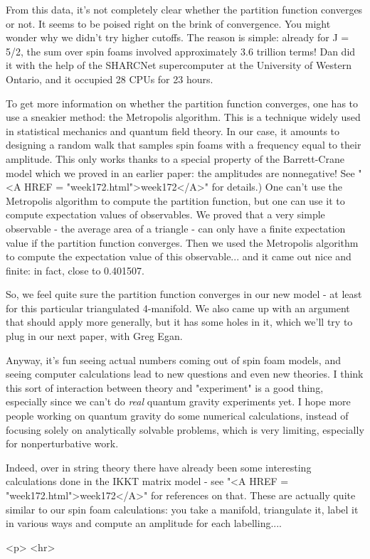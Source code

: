 From this data, it's not completely clear whether the partition function
converges or not.  It seems to be poised right on the brink of convergence.  
You might wonder why we didn't try higher cutoffs.  The reason is simple: 
already for J = 5/2, the sum over spin foams involved approximately 3.6 
trillion terms!  Dan did it with the help of the SHARCNet supercomputer 
at the University of Western Ontario, and it occupied 28 CPUs for 23 hours.

To get more information on whether the partition function converges, one
has to use a sneakier method: the Metropolis algorithm.  This is a
technique widely used in statistical mechanics and quantum field theory.
In our case, it amounts to designing a random walk that samples spin
foams with a frequency equal to their amplitude.  This only works thanks
to a special property of the Barrett-Crane model which we proved in an
earlier paper: the amplitudes are nonnegative!  See "<A HREF =
"week172.html">week172</A>" for details.)  One can't use the
Metropolis algorithm to compute the partition function, but one can use
it to compute expectation values of observables.  We proved that a very
simple observable - the average area of a triangle - can only have a
finite expectation value if the partition function converges.  Then we
used the Metropolis algorithm to compute the expectation value of this
observable... and it came out nice and finite: in fact, close to
0.401507.

So, we feel quite sure the partition function converges in our new model - 
at least for this particular triangulated 4-manifold.  We also came up
with an argument that should apply more generally, but it has some 
holes in it, which we'll try to plug in our next paper, with Greg Egan.

Anyway, it's fun seeing actual numbers coming out of spin foam models,
and seeing computer calculations lead to new questions and even new
theories.  I think this sort of interaction between theory and
"experiment" is a good thing, especially since we can't do
\emph{real} quantum gravity experiments yet.  I hope more people
working on quantum gravity do some numerical calculations, instead of
focusing solely on analytically solvable problems, which is very
limiting, especially for nonperturbative work.

Indeed, over in string theory there have already been some interesting
calculations done in the IKKT matrix model - see "<A HREF =
"week172.html">week172</A>" for references on that.  These are
actually quite similar to our spin foam calculations: you take a
manifold, triangulate it, label it in various ways and compute an
amplitude for each labelling....

<p> <hr>




